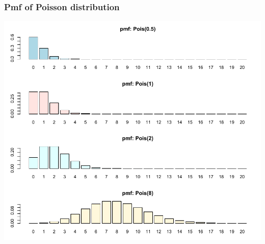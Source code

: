 \documentclass[slidestop,compress,mathserif]{beamer}
\begin{document}
\begin{frame}\frametitle{Pmf of Poisson distribution}

\vspace{-0.5cm}
\begin{center}
\includegraphics[scale = 0.6]{figures/pmf3}
\end{center}

\end{frame}
\end{document}

